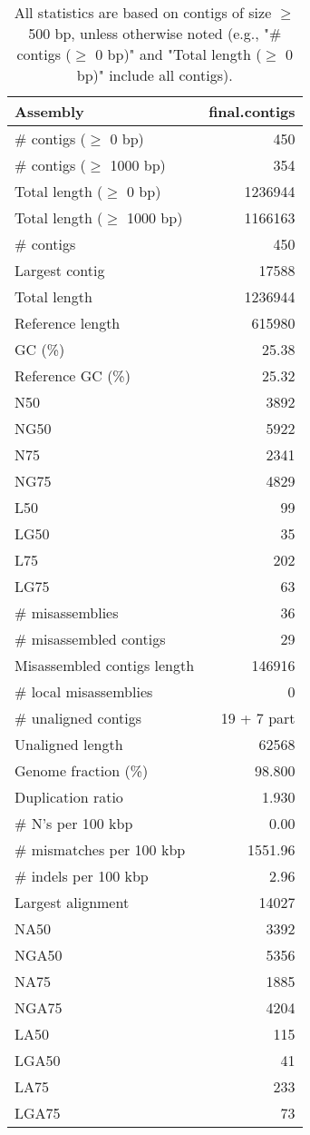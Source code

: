 \documentclass[12pt,a4paper]{article}
\begin{document}
\begin{table}[ht]
\begin{center}
\caption{All statistics are based on contigs of size $\geq$ 500 bp, unless otherwise noted (e.g., "\# contigs ($\geq$ 0 bp)" and "Total length ($\geq$ 0 bp)" include all contigs).}
\begin{tabular}{|l*{1}{|r}|}
\hline
Assembly & final.contigs \\ \hline
\# contigs ($\geq$ 0 bp) & 450 \\ \hline
\# contigs ($\geq$ 1000 bp) & 354 \\ \hline
Total length ($\geq$ 0 bp) & 1236944 \\ \hline
Total length ($\geq$ 1000 bp) & 1166163 \\ \hline
\# contigs & 450 \\ \hline
Largest contig & 17588 \\ \hline
Total length & 1236944 \\ \hline
Reference length & 615980 \\ \hline
GC (\%) & 25.38 \\ \hline
Reference GC (\%) & 25.32 \\ \hline
N50 & 3892 \\ \hline
NG50 & 5922 \\ \hline
N75 & 2341 \\ \hline
NG75 & 4829 \\ \hline
L50 & 99 \\ \hline
LG50 & 35 \\ \hline
L75 & 202 \\ \hline
LG75 & 63 \\ \hline
\# misassemblies & 36 \\ \hline
\# misassembled contigs & 29 \\ \hline
Misassembled contigs length & 146916 \\ \hline
\# local misassemblies & 0 \\ \hline
\# unaligned contigs & 19 + 7 part \\ \hline
Unaligned length & 62568 \\ \hline
Genome fraction (\%) & 98.800 \\ \hline
Duplication ratio & 1.930 \\ \hline
\# N's per 100 kbp & 0.00 \\ \hline
\# mismatches per 100 kbp & 1551.96 \\ \hline
\# indels per 100 kbp & 2.96 \\ \hline
Largest alignment & 14027 \\ \hline
NA50 & 3392 \\ \hline
NGA50 & 5356 \\ \hline
NA75 & 1885 \\ \hline
NGA75 & 4204 \\ \hline
LA50 & 115 \\ \hline
LGA50 & 41 \\ \hline
LA75 & 233 \\ \hline
LGA75 & 73 \\ \hline
\end{tabular}
\end{center}
\end{table}
\end{document}
